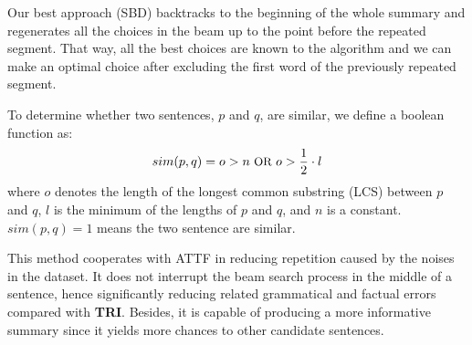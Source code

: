 Our best approach (SBD) backtracks to the beginning of the whole summary
and regenerates all the choices in the beam up to the point before
the repeated segment. That way, all the best choices are known to the
algorithm and we can make an optimal choice after excluding the first word
of the previously repeated segment. 

To determine whether two sentences, 
$p$ and $q$, are similar, we define a boolean function as:
\begin{equation}\label{eq:s}
\small
    sim(p,q) = o > n\text{ OR }o > \frac{1}{2}\cdot l
\end{equation}
where $o$ denotes the length of the longest common substring (LCS) between $p$ and $q$, 
$l$ is the minimum of the lengths of $p$ and $q$, and $n$ is a constant. 
$sim(p,q)=1$ means the two sentence are similar.

This method cooperates with ATTF in 
reducing repetition caused by the noises in the dataset.
It does not interrupt the beam search process in the middle of a sentence, 
hence significantly reducing related grammatical and factual errors 
compared with \textbf{TRI}.
Besides, it is capable of producing a more informative summary since
it yields more chances to other candidate sentences.
